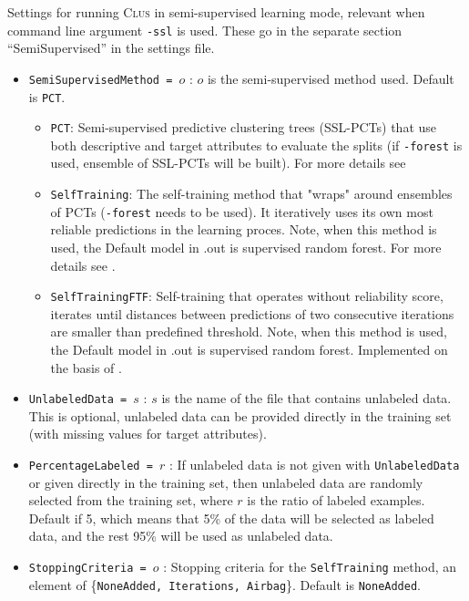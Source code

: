 \documentclass[a4paper]{report}
\newcommand{\clus}{\textsc{Clus}}
\begin{document}
Settings for running \clus{} in semi-supervised learning mode, relevant when command line argument {\tt -ssl} is used. These go in the separate section ``SemiSupervised'' in the settings file.

\begin{itemize}
\item {\tt SemiSupervisedMethod = $o$} : $o$ is the semi-supervised method used. Default is {\tt PCT}.
  \begin{itemize}
  \item {\tt PCT}: Semi-supervised predictive clustering trees (SSL-PCTs) that use both descriptive and target attributes to evaluate the splits (if {\tt -forest} is used, ensemble of SSL-PCTs will be built). For more details see \cite{levatic2017_SSL4MTR_distanceBased,levatic2017_SSL4class_distanceBased}
  \item {\tt SelfTraining}: The self-training method that "wraps" around ensembles of PCTs ({\tt -forest} needs to be used). It iteratively uses its own most reliable predictions in the learning proces. Note, when this method is used, the Default model in .out is supervised random forest. For more details see \cite{levatic2017_self-training}.  
  \item {\tt SelfTrainingFTF}: Self-training that operates without reliability score, iterates until distances between predictions of two consecutive iterations are smaller than predefined threshold. Note, when this method is used, the Default model in .out is supervised random forest. Implemented on the basis of \cite{culp_iterative_2008}.
  \end{itemize}
\item {\tt UnlabeledData = $s$} : $s$ is the name of the file that contains unlabeled data. This is optional, unlabeled data can be provided directly in the training set (with missing values for target attributes).
\item {\tt PercentageLabeled = $r$} : If unlabeled data is not given with {\tt UnlabeledData} or given directly in the training set, then unlabeled data are randomly selected from the training set, where $r$ is the ratio of labeled examples. Default if 5, which means that 5\% of the data will be selected as labeled data, and the rest 95\% will be used as unlabeled data. 
\item {\tt StoppingCriteria = $o$} : Stopping criteria for the {\tt SelfTraining} method, an element of \{{\tt NoneAdded, Iterations, Airbag}\}. Default is {\tt NoneAdded}.
\begin{itemize}

\end{itemize}
\end{itemize}
\end{document}
